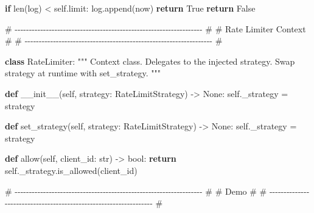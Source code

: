 \documentclass[11pt]{article}
\newenvironment{Shaded}{\begin{snugshade}}{\end{snugshade}}
\newcommand{\BuiltInTok}[1]{\textcolor[rgb]{0.50,0.55,0.55}{#1}}
\newcommand{\CommentTok}[1]{\textcolor[rgb]{0.48,0.49,0.49}{#1}}
\newcommand{\ControlFlowTok}[1]{\textcolor[rgb]{0.99,0.74,0.29}{\textbf{#1}}}
\newcommand{\FunctionTok}[1]{\textcolor[rgb]{0.56,0.27,0.68}{#1}}
\newcommand{\KeywordTok}[1]{\textcolor[rgb]{0.81,0.81,0.76}{\textbf{#1}}}
\newcommand{\NormalTok}[1]{\textcolor[rgb]{0.81,0.81,0.76}{#1}}
\newcommand{\OperatorTok}[1]{\textcolor[rgb]{0.81,0.81,0.76}{#1}}
\newcommand{\VariableTok}[1]{\textcolor[rgb]{0.15,0.68,0.68}{#1}}
\begin{document}
\begin{Shaded}
\begin{Highlighting}[]
            \ControlFlowTok{if} \BuiltInTok{len}\NormalTok{(log) }\OperatorTok{\textless{}} \VariableTok{self}\NormalTok{.limit:}
\NormalTok{                log.append(now)}
                \ControlFlowTok{return} \VariableTok{True}
            \ControlFlowTok{return} \VariableTok{False}


\CommentTok{\# {-}{-}{-}{-}{-}{-}{-}{-}{-}{-}{-}{-}{-}{-}{-}{-}{-}{-}{-}{-}{-}{-}{-}{-}{-}{-}{-}{-}{-}{-}{-}{-}{-}{-}{-}{-}{-}{-}{-}{-}{-}{-}{-}{-}{-}{-}{-}{-}{-}{-}{-}{-}{-}{-}{-}{-}{-}{-}{-}{-}{-}{-}{-}{-}{-}{-} \#}
\CommentTok{\# Rate Limiter Context                                                \#}
\CommentTok{\# {-}{-}{-}{-}{-}{-}{-}{-}{-}{-}{-}{-}{-}{-}{-}{-}{-}{-}{-}{-}{-}{-}{-}{-}{-}{-}{-}{-}{-}{-}{-}{-}{-}{-}{-}{-}{-}{-}{-}{-}{-}{-}{-}{-}{-}{-}{-}{-}{-}{-}{-}{-}{-}{-}{-}{-}{-}{-}{-}{-}{-}{-}{-}{-}{-}{-} \#}

\KeywordTok{class}\NormalTok{ RateLimiter:}
    \CommentTok{"""}
\CommentTok{    Context class. Delegates to the injected strategy.}
\CommentTok{    Swap strategy at runtime with \textasciigrave{}set\_strategy\textasciigrave{}.}
\CommentTok{    """}

    \KeywordTok{def} \FunctionTok{\_\_init\_\_}\NormalTok{(}\VariableTok{self}\NormalTok{, strategy: RateLimitStrategy) }\OperatorTok{{-}\textgreater{}} \VariableTok{None}\NormalTok{:}
        \VariableTok{self}\NormalTok{.\_strategy }\OperatorTok{=}\NormalTok{ strategy}

    \KeywordTok{def}\NormalTok{ set\_strategy(}\VariableTok{self}\NormalTok{, strategy: RateLimitStrategy) }\OperatorTok{{-}\textgreater{}} \VariableTok{None}\NormalTok{:}
        \VariableTok{self}\NormalTok{.\_strategy }\OperatorTok{=}\NormalTok{ strategy}

    \KeywordTok{def}\NormalTok{ allow(}\VariableTok{self}\NormalTok{, client\_id: }\BuiltInTok{str}\NormalTok{) }\OperatorTok{{-}\textgreater{}} \BuiltInTok{bool}\NormalTok{:}
        \ControlFlowTok{return} \VariableTok{self}\NormalTok{.\_strategy.is\_allowed(client\_id)}


\CommentTok{\# {-}{-}{-}{-}{-}{-}{-}{-}{-}{-}{-}{-}{-}{-}{-}{-}{-}{-}{-}{-}{-}{-}{-}{-}{-}{-}{-}{-}{-}{-}{-}{-}{-}{-}{-}{-}{-}{-}{-}{-}{-}{-}{-}{-}{-}{-}{-}{-}{-}{-}{-}{-}{-}{-}{-}{-}{-}{-}{-}{-}{-}{-}{-}{-}{-}{-} \#}
\CommentTok{\# Demo                                                                \#}
\CommentTok{\# {-}{-}{-}{-}{-}{-}{-}{-}{-}{-}{-}{-}{-}{-}{-}{-}{-}{-}{-}{-}{-}{-}{-}{-}{-}{-}{-}{-}{-}{-}{-}{-}{-}{-}{-}{-}{-}{-}{-}{-}{-}{-}{-}{-}{-}{-}{-}{-}{-}{-}{-}{-}{-}{-}{-}{-}{-}{-}{-}{-}{-}{-}{-}{-}{-}{-} \#}


\end{Highlighting}
\end{Shaded}
\end{document}

